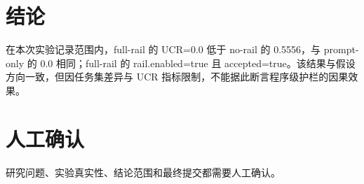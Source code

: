 \documentclass[UTF8]{ctexart}
\begin{document}
\section{结论}
在本次实验记录范围内，full-\allowbreak{}rail 的 UCR=0.0 低于 no-\allowbreak{}rail 的 0.5556，与 prompt-\allowbreak{}only 的 0.0 相同；full-\allowbreak{}rail 的 rail.enabled=true 且 accepted=true。该结果与假设方向一致，但因任务集差异与 UCR 指标限制，不能据此断言程序级护栏的因果效果。
\section{人工确认}
研究问题、实验真实性、结论范围和最终提交都需要人工确认。
\end{document}
